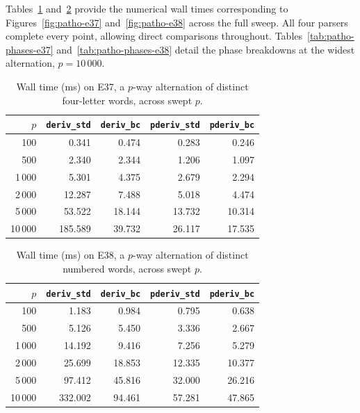 %
%
%

Tables~\ref{tab:patho-e37-all-parsers}
and~\ref{tab:patho-e38-all-parsers}
provide the numerical wall times corresponding
to Figures~\ref{fig:patho-e37}
and~\ref{fig:patho-e38} across the full sweep.
All four parsers complete every point,
allowing direct comparisons throughout.
Tables~\ref{tab:patho-phases-e37}
and~\ref{tab:patho-phases-e38}
detail the phase breakdowns at the widest
alternation, $p=10\,000$.

\begin{table}[H]
\centering
\small
\setlength{\tabcolsep}{4pt}
\begin{tabular*}{\textwidth}{@{\extracolsep{\fill}} r rrrr}
\hline
$p$ & \texttt{deriv\_std} & \texttt{deriv\_bc} & \texttt{pderiv\_std} & \texttt{pderiv\_bc} \\
\hline
100          &     0.341 &     0.474 &     0.283 &     0.246 \\
500          &     2.340 &     2.344 &     1.206 &     1.097 \\
1\,000       &     5.301 &     4.375 &     2.679 &     2.294 \\
2\,000       &    12.287 &     7.488 &     5.018 &     4.474 \\
5\,000       &    53.522 &    18.144 &    13.732 &    10.314 \\
10\,000      &   185.589 &    39.732 &    26.117 &    17.535 \\
\hline
\end{tabular*}
\caption{Wall time (ms) on E37, a $p$-way alternation of distinct
four-letter words, across swept $p$.}
\label{tab:patho-e37-all-parsers}
\end{table}

%

\begin{table}[H]
\centering
\small
\setlength{\tabcolsep}{4pt}
\begin{tabular*}{\textwidth}{@{\extracolsep{\fill}} r rrrr}
\hline
$p$ & \texttt{deriv\_std} & \texttt{deriv\_bc} & \texttt{pderiv\_std} & \texttt{pderiv\_bc} \\
\hline
100          &     1.183 &     0.984 &     0.795 &     0.638 \\
500          &     5.126 &     5.450 &     3.336 &     2.667 \\
1\,000       &    14.192 &     9.416 &     7.256 &     5.279 \\
2\,000       &    25.699 &    18.853 &    12.335 &    10.377 \\
5\,000       &    97.412 &    45.816 &    32.000 &    26.216 \\
10\,000      &   332.002 &    94.461 &    57.281 &    47.865 \\
\hline
\end{tabular*}
\caption{Wall time (ms) on E38, a $p$-way alternation of distinct
numbered words, across swept $p$.}
\label{tab:patho-e38-all-parsers}
\end{table}

